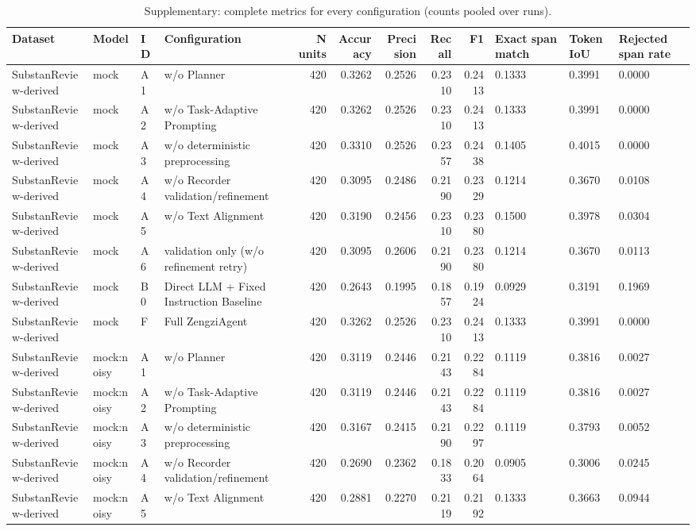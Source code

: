 \begin{table}
\caption{Supplementary: complete metrics for every configuration (counts pooled over runs).}
\label{tab:table_ablation_full_metrics}
\begin{tabular}{llllrrrrrlll}
\toprule
Dataset & Model & ID & Configuration & N units & Accuracy & Precision & Recall & F1 & Exact span match & Token IoU & Rejected span rate \\
\midrule
SubstanReview-derived & mock & A1 & w/o Planner & 420 & 0.3262 & 0.2526 & 0.2310 & 0.2413 & 0.1333 & 0.3991 & 0.0000 \\
SubstanReview-derived & mock & A2 & w/o Task-Adaptive Prompting & 420 & 0.3262 & 0.2526 & 0.2310 & 0.2413 & 0.1333 & 0.3991 & 0.0000 \\
SubstanReview-derived & mock & A3 & w/o deterministic preprocessing & 420 & 0.3310 & 0.2526 & 0.2357 & 0.2438 & 0.1405 & 0.4015 & 0.0000 \\
SubstanReview-derived & mock & A4 & w/o Recorder validation/refinement & 420 & 0.3095 & 0.2486 & 0.2190 & 0.2329 & 0.1214 & 0.3670 & 0.0108 \\
SubstanReview-derived & mock & A5 & w/o Text Alignment & 420 & 0.3190 & 0.2456 & 0.2310 & 0.2380 & 0.1500 & 0.3978 & 0.0304 \\
SubstanReview-derived & mock & A6 & validation only (w/o refinement retry) & 420 & 0.3095 & 0.2606 & 0.2190 & 0.2380 & 0.1214 & 0.3670 & 0.0113 \\
SubstanReview-derived & mock & B0 & Direct LLM + Fixed Instruction Baseline & 420 & 0.2643 & 0.1995 & 0.1857 & 0.1924 & 0.0929 & 0.3191 & 0.1969 \\
SubstanReview-derived & mock & F & Full ZengziAgent & 420 & 0.3262 & 0.2526 & 0.2310 & 0.2413 & 0.1333 & 0.3991 & 0.0000 \\
SubstanReview-derived & mock:noisy & A1 & w/o Planner & 420 & 0.3119 & 0.2446 & 0.2143 & 0.2284 & 0.1119 & 0.3816 & 0.0027 \\
SubstanReview-derived & mock:noisy & A2 & w/o Task-Adaptive Prompting & 420 & 0.3119 & 0.2446 & 0.2143 & 0.2284 & 0.1119 & 0.3816 & 0.0027 \\
SubstanReview-derived & mock:noisy & A3 & w/o deterministic preprocessing & 420 & 0.3167 & 0.2415 & 0.2190 & 0.2297 & 0.1119 & 0.3793 & 0.0052 \\
SubstanReview-derived & mock:noisy & A4 & w/o Recorder validation/refinement & 420 & 0.2690 & 0.2362 & 0.1833 & 0.2064 & 0.0905 & 0.3006 & 0.0245 \\
SubstanReview-derived & mock:noisy & A5 & w/o Text Alignment & 420 & 0.2881 & 0.2270 & 0.2119 & 0.2192 & 0.1333 & 0.3663 & 0.0944 \\

\end{tabular}
\end{table}
